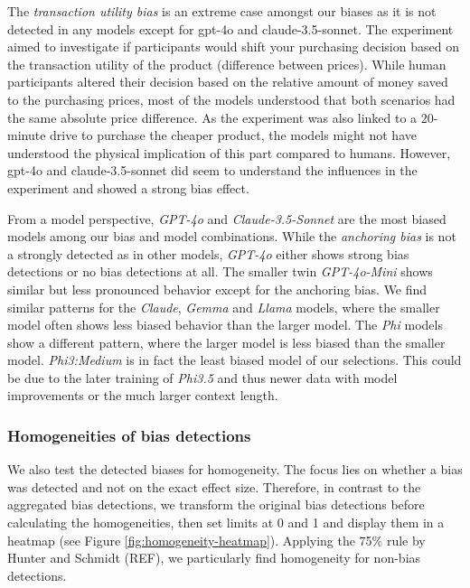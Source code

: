 The \textit{transaction utility bias} is an extreme case amongst our biases as it is not detected in any models except for gpt-4o and claude-3.5-sonnet. The experiment aimed to investigate if participants would shift your purchasing decision based on the transaction utility of the product (difference between prices). While human participants altered their decision based on the relative amount of money saved to the purchasing prices, most of the models understood that both scenarios had the same absolute price difference. As the experiment was also linked to a 20-minute drive to purchase the cheaper product, the models might not have understood the physical implication of this part compared to humans. However, gpt-4o and claude-3.5-sonnet did seem to understand the influences in the experiment and showed a strong bias effect.

\par From a model perspective, \textit{GPT-4o} and \textit{Claude-3.5-Sonnet} are the most biased models among our bias and model combinations. While the \textit{anchoring bias} is not a strongly detected as in other models, \textit{GPT-4o} either shows strong bias detections or no bias detections at all. The smaller twin \textit{GPT-4o-Mini} shows similar but less pronounced behavior except for the anchoring bias. We find similar patterns for the \textit{Claude}, \textit{Gemma} and \textit{Llama} models, where the smaller model often shows less biased behavior than the larger model. The \textit{Phi} models show a different pattern, where the larger model is less biased than the smaller model. \textit{Phi3:Medium} is in fact the least biased model of our selections. This could be due to the later training of \textit{Phi3.5} and thus newer data with model improvements or the much larger context length.


\subsubsection{Homogeneities of bias detections}
\par We also test the detected biases for homogeneity. The focus lies on whether a bias was detected and not on the exact effect size. Therefore, in contrast to the aggregated bias detections, we transform the original bias detections before calculating the homogeneities, then set limits at 0 and 1 and display them in a heatmap (see Figure \ref{fig:homogeneity-heatmap}). Applying the 75\% rule by Hunter and Schmidt (REF), we particularly find homogeneity for non-bias detections.

